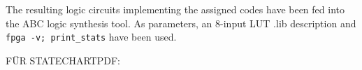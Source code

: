 The resulting logic circuits implementing the assigned codes have been fed into the ABC logic synthesis tool. As parameters, an 8-input LUT .lib description and \texttt{fpga -v; print\_stats} have been used.


















FÜR STATECHARTPDF:



